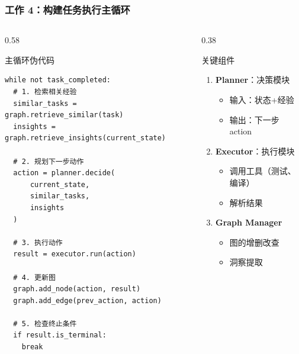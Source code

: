 \documentclass[aspectratio=169,10pt]{beamer}
\begin{document}
\begin{frame}[fragile]
  \frametitle{工作 4：构建任务执行主循环}

  \begin{columns}[T]
    \begin{column}{0.58\textwidth}
      \begin{block}{主循环伪代码}
        \footnotesize
        \begin{verbatim}
while not task_completed:
  # 1. 检索相关经验
  similar_tasks = graph.retrieve_similar(task)
  insights = graph.retrieve_insights(current_state)

  # 2. 规划下一步动作
  action = planner.decide(
      current_state,
      similar_tasks,
      insights
  )

  # 3. 执行动作
  result = executor.run(action)

  # 4. 更新图
  graph.add_node(action, result)
  graph.add_edge(prev_action, action)

  # 5. 检查终止条件
  if result.is_terminal:
    break
        \end{verbatim}
      \end{block}
    \end{column}

    \begin{column}{0.38\textwidth}
      \begin{block}{关键组件}
        \footnotesize
        \begin{enumerate}
          \item \textbf{Planner}：决策模块
          \begin{itemize}
            \item 输入：状态+经验
            \item 输出：下一步 action
          \end{itemize}

          \vspace{0.2cm}

          \item \textbf{Executor}：执行模块
          \begin{itemize}
            \item 调用工具（测试、编译）
            \item 解析结果
          \end{itemize}

          \vspace{0.2cm}

          \item \textbf{Graph Manager}
          \begin{itemize}
            \item 图的增删改查
            \item 洞察提取
          \end{itemize}
        \end{enumerate}
      \end{block}
    \end{column}
  \end{columns}
\end{frame}
\end{document}
